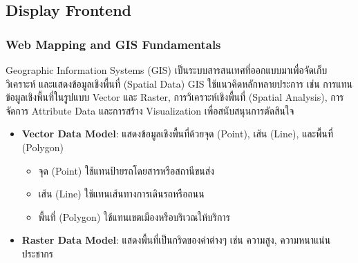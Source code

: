 \subsection{Display Frontend}
\subsubsection{Web Mapping and GIS Fundamentals}
\indent Geographic Information Systems (GIS) เป็นระบบสารสนเทศที่ออกแบบมาเพื่อจัดเก็บ วิเคราะห์ 
และแสดงข้อมูลเชิงพื้นที่ (Spatial Data) GIS ใช้แนวคิดหลักหลายประการ เช่น การแทนข้อมูลเชิงพื้นที่ในรูปแบบ Vector 
และ Raster, การวิเคราะห์เชิงพื้นที่ (Spatial Analysis), การจัดการ Attribute Data 
และการสร้าง Visualization เพื่อสนับสนุนการตัดสินใจ
\begin{itemize}
    \item \textbf{Vector Data Model}: แสดงข้อมูลเชิงพื้นที่ด้วยจุด (Point), เส้น (Line), และพื้นที่ (Polygon)
    \begin{itemize}
        \item จุด (Point) ใช้แทนป้ายรถโดยสารหรือสถานีขนส่ง
        \item เส้น (Line) ใช้แทนเส้นทางการเดินรถหรือถนน
        \item พื้นที่ (Polygon) ใช้แทนเขตเมืองหรือบริเวณให้บริการ
    \end{itemize}
    \item \textbf{Raster Data Model}: แสดงพื้นที่เป็นกริดของค่าต่างๆ เช่น ความสูง, ความหนาแน่นประชากร
\end{itemize}

\begin{center}
\end{center}

